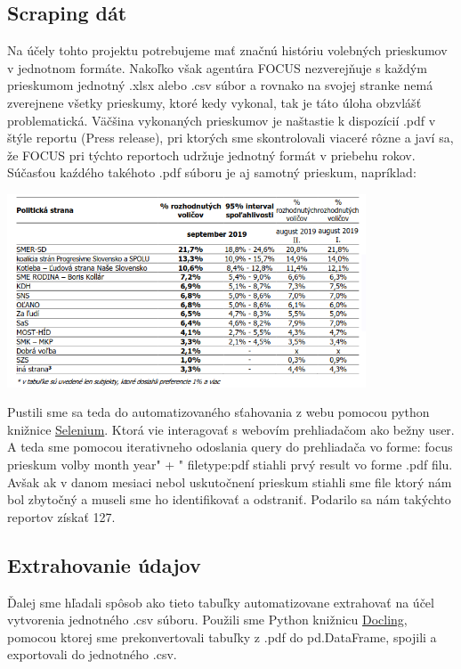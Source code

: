 \documentclass[main.tex]{subfiles}
\begin{document}
	
\subsection{Scraping dát}
Na účely tohto projektu potrebujeme mať značnú históriu volebných prieskumov v jednotnom formáte.
Nakoľko však agentúra FOCUS nezverejňuje s každým prieskumom jednotný .xlsx alebo .csv súbor a rovnako na svojej stranke nemá zverejnene všetky prieskumy, ktoré kedy vykonal, tak je táto úloha obzvlášť problematická.
Väčšina vykonaných prieskumov je naštastie k dispozícií .pdf v štýle reportu (Press release), pri ktorých sme skontrolovali viaceré rôzne a javí sa, že FOCUS pri týchto reportoch udržuje jednotný formát v priebehu rokov.
Súčasťou kaźdého takéhoto .pdf súboru je aj samotný prieskum, napríklad:

\includegraphics[width=0.8\textwidth]{figs/priklad-focus-prieskumu.png}

Pustili sme sa teda do automatizovaného sťahovania z webu pomocou python knižnice \href{https://github.com/SeleniumHQ/Selenium}{Selenium}. 
Ktorá vie interagovať s webovím prehliadačom ako bežny user. A teda sme pomocou iterativneho odoslania query do prehliadača vo forme: focus prieskum volby {month} {year}" + " filetype:pdf
stiahli prvý result vo forme .pdf filu. Avšak ak v danom mesiaci nebol uskutočnení prieskum stiahli sme file ktorý nám bol zbytočný a museli sme ho identifikovať a odstraniť. 
Podarilo sa nám takýchto reportov získať 127. 


\subsection{Extrahovanie údajov}
Ďalej sme hľadali spôsob ako tieto tabuľky automatizovane extrahovať na účel vytvorenia jednotného .csv súboru.
Použili sme Python knižnicu \href{https://github.com/DS4SD/docling}{Docling}, pomocou ktorej sme prekonvertovali tabuľky z .pdf do pd.DataFrame, spojili a exportovali do jednotného .csv.
\end{document}
